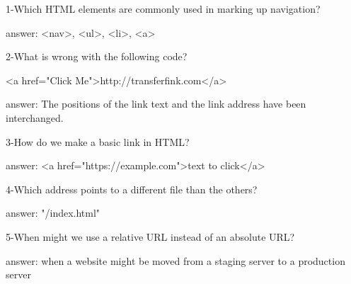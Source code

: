 1-Which HTML elements are commonly used in marking up navigation?

answer: <nav>, <ul>, <li>, <a>

2-What is wrong with the following code?

<a href="Click Me">http://transferfink.com</a>

answer: The positions of the link text and the link address have been interchanged.

3-How do we make a basic link in HTML?

answer: <a href="https://example.com">text to click</a>

4-Which address points to a different file than the others?

answer: "/index.html"

5-When might we use a relative URL instead of an absolute URL?

answer: when a website might be moved from a staging server to a production server
